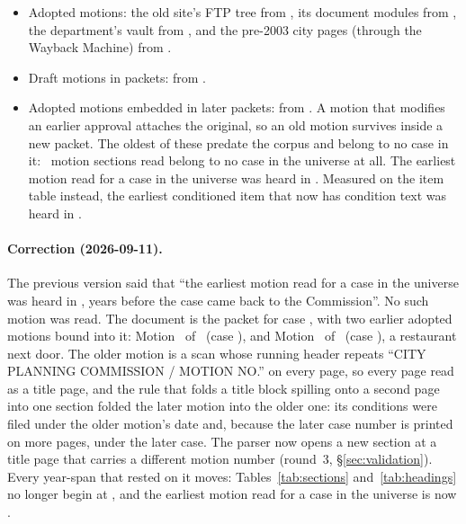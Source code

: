 \documentclass[11pt]{article}
\begin{document}
\begin{itemize}
\item Adopted motions: the old site's FTP tree from \ccEarliestFtp, its document modules from
\ccEarliestModules, the department's vault from \ccEarliestVault, and the pre-2003 city pages
(through the Wayback Machine) from \ccEarliestWayback.
\item Draft motions in packets: from \ccEarliestPackets.
\item Adopted motions embedded in later packets: from \ccEarliestEmbedded. A motion that
modifies an earlier approval attaches the original, so an old motion survives inside a new
packet. The oldest of these predate the corpus and belong to no case in it: \ccSectionsOutsideUniverse\
motion sections read belong to no case in the universe at all. The earliest motion read for a
case in the universe was heard in \ccEarliestInUniverse. Measured on the item table instead, the
earliest conditioned item that now has condition text was heard in \ccEarliestItemYear.
\end{itemize}

\paragraph{Correction (2026-09-11).} The previous version said that ``the earliest motion read
for a case in the universe was heard in \ccRprevEarliestInUniverse, years before the case came
back to the Commission''. No such motion was read. The document is the packet for case
\texttt{\ccFixPacketCase}, with two earlier adopted motions bound into it: Motion
\ccFixOldMotion\ of \ccFixOldDate\ (case \texttt{\ccFixOldCase}), and Motion \ccFixNewMotion\ of
\ccFixNewDate\ (case \texttt{\ccFixNewCase}), a restaurant next door. The older motion is a scan
whose running header repeats ``CITY PLANNING COMMISSION / MOTION NO.'' on every page, so every
page read as a title page, and the rule that folds a title block spilling onto a second page
into one section folded the later motion into the older one: its conditions were filed under
the older motion's date and, because the later case number is printed on more pages, under the
later case. The parser now opens a new section at a title page that carries a different motion
number (round~3, \S\ref{sec:validation}). Every year-span that rested on it moves:
Tables~\ref{tab:sections} and~\ref{tab:headings} no longer begin at
\ccRprevEarliestInUniverse, and the earliest motion read for a case in the universe is now
\ccEarliestInUniverse.
\end{document}

